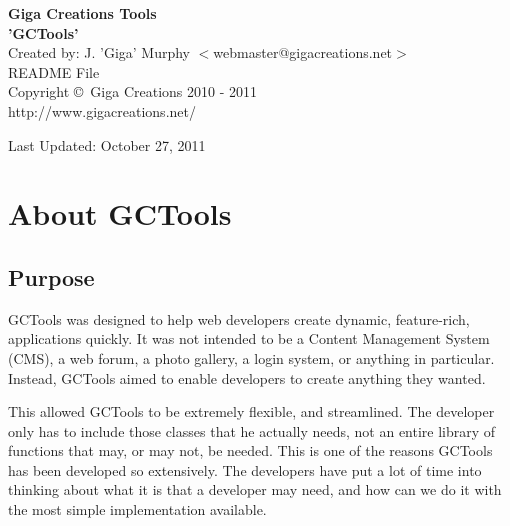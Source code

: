 \documentclass{article}
\begin{document}
\begin{titlepage}
\vspace*{\fill}
\begin{center}
\huge{{\bf Giga Creations Tools}}\\
{\bf 'GCTools'}\\
\vspace{18pt}
Created by: J. 'Giga' Murphy $<$webmaster@gigacreations.net$>$\\
\vspace{12pt}
README File\\
\vspace{12pt}
Copyright \copyright\ Giga Creations 2010 - 2011\\
\vspace{12pt}
http://www.gigacreations.net/
\end{center}
\vspace*{\fill}
\begin{center}
Last Updated: October 27, 2011
\end{center}
\end{titlepage}

\setlength{\topmargin}{0in}
\setlength{\headheight}{0in}
\setlength{\headsep}{0in}
\setlength{\textheight}{9in}
\setlength{\textwidth}{6.5in}
\setlength{\oddsidemargin}{0in}
\setlength{\evensidemargin}{0in}
\setlength{\parindent}{0.0in}
\setlength{\parskip}{0.1in}

\tableofcontents
\newpage

\section{About GCTools}
\subsection{Purpose}
GCTools was designed to help web developers create dynamic, feature-rich, applications quickly. It was not intended to be a Content Management System (CMS), a web forum, a photo gallery, a login system, or anything in particular. Instead, GCTools aimed to enable developers to create anything they wanted.

This allowed GCTools to be extremely flexible, and streamlined. The developer only has to include those classes that he actually needs, not an entire library of functions that may, or may not, be needed. This is one of the reasons GCTools has been developed so extensively. The developers have put a lot of time into thinking about what it is that a developer may need, and how can we do it with the most simple implementation available.
\end{document}
